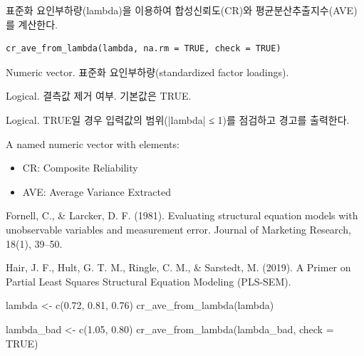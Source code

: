 \documentclass[a4paper]{book}
\begin{document}
%
\begin{Description}
표준화 요인부하량(lambda)을 이용하여
합성신뢰도(CR)와 평균분산추출지수(AVE)를 계산한다.
\end{Description}
%
\begin{Usage}
\begin{verbatim}
cr_ave_from_lambda(lambda, na.rm = TRUE, check = TRUE)
\end{verbatim}
\end{Usage}
%
\begin{Arguments}
\begin{ldescription}
\item[\code{lambda}] Numeric vector.
표준화 요인부하량(standardized factor loadings).

\item[\code{na.rm}] Logical.
결측값 제거 여부. 기본값은 TRUE.

\item[\code{check}] Logical.
TRUE일 경우 입력값의 범위(|lambda| ≤ 1)를 점검하고 경고를 출력한다.
\end{ldescription}
\end{Arguments}
%
\begin{Value}
A named numeric vector with elements:
\begin{itemize}

\item{} CR: Composite Reliability
\item{} AVE: Average Variance Extracted

\end{itemize}

\end{Value}
%
\begin{References}
Fornell, C., \& Larcker, D. F. (1981).
Evaluating structural equation models with unobservable variables
and measurement error. Journal of Marketing Research, 18(1), 39–50.

Hair, J. F., Hult, G. T. M., Ringle, C. M., \& Sarstedt, M. (2019).
A Primer on Partial Least Squares Structural Equation Modeling (PLS-SEM).
\end{References}
%
\begin{Examples}
\begin{ExampleCode}
lambda <- c(0.72, 0.81, 0.76)
cr_ave_from_lambda(lambda)

lambda_bad <- c(1.05, 0.80)
cr_ave_from_lambda(lambda_bad, check = TRUE)

\end{ExampleCode}
\end{Examples}
\end{document}
